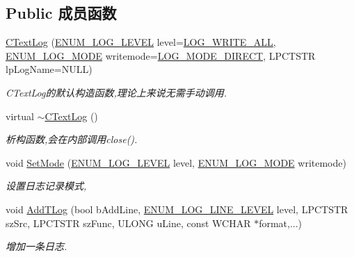 \subsection*{Public 成员函数}
\begin{DoxyCompactItemize}
\item 
\hyperlink{classcommon_1_1_c_text_log_a77d68466b36334d333ba59e91e8055b2}{C\+Text\+Log} (\hyperlink{classcommon_1_1_c_text_log_ae22e9f5eba143051e1193e62caf63aee}{E\+N\+U\+M\+\_\+\+L\+O\+G\+\_\+\+L\+E\+V\+E\+L} level=\hyperlink{classcommon_1_1_c_text_log_ae22e9f5eba143051e1193e62caf63aeea7ab4c59a70fe3bf1c63c45e7183a0326}{L\+O\+G\+\_\+\+W\+R\+I\+T\+E\+\_\+\+A\+L\+L}, \hyperlink{classcommon_1_1_c_text_log_ab0c8fabb54ada6443cadd1fbfe65cf2e}{E\+N\+U\+M\+\_\+\+L\+O\+G\+\_\+\+M\+O\+D\+E} writemode=\hyperlink{classcommon_1_1_c_text_log_ab0c8fabb54ada6443cadd1fbfe65cf2eaa76de1b0920b606311d0d521477a0731}{L\+O\+G\+\_\+\+M\+O\+D\+E\+\_\+\+D\+I\+R\+E\+C\+T}, L\+P\+C\+T\+S\+T\+R lp\+Log\+Name=N\+U\+L\+L)
\begin{DoxyCompactList}\small\item\em C\+Text\+Log的默认构造函数,理论上来说无需手动调用. \end{DoxyCompactList}\item 
virtual \hyperlink{classcommon_1_1_c_text_log_a1a77b26b4412151dd5a655903b652633}{$\sim$\+C\+Text\+Log} ()
\begin{DoxyCompactList}\small\item\em 析构函数,会在内部调用close(). \end{DoxyCompactList}\item 
void \hyperlink{classcommon_1_1_c_text_log_a53ecacf46cb9b0284ba3acd8c3b1d082}{Set\+Mode} (\hyperlink{classcommon_1_1_c_text_log_ae22e9f5eba143051e1193e62caf63aee}{E\+N\+U\+M\+\_\+\+L\+O\+G\+\_\+\+L\+E\+V\+E\+L} level, \hyperlink{classcommon_1_1_c_text_log_ab0c8fabb54ada6443cadd1fbfe65cf2e}{E\+N\+U\+M\+\_\+\+L\+O\+G\+\_\+\+M\+O\+D\+E} writemode)
\begin{DoxyCompactList}\small\item\em 设置日志记录模式, \end{DoxyCompactList}\item 
void \hyperlink{classcommon_1_1_c_text_log_a2df32e6ff0a7c85c76b894bdf1a36103}{Add\+T\+Log} (bool b\+Add\+Line, \hyperlink{namespacecommon_af715c011984b434cbb7f04b0d4e57589}{E\+N\+U\+M\+\_\+\+L\+O\+G\+\_\+\+L\+I\+N\+E\+\_\+\+L\+E\+V\+E\+L} level, L\+P\+C\+T\+S\+T\+R sz\+Src, L\+P\+C\+T\+S\+T\+R sz\+Func, U\+L\+O\+N\+G u\+Line, const W\+C\+H\+A\+R $\ast$format,...)
\begin{DoxyCompactList}\small\item\em 增加一条日志. \end{DoxyCompactList}\item 

\end{DoxyCompactItemize}
